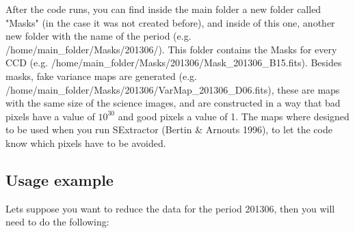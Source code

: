 \documentclass[letter, 12pt]{article}
\begin{document}
After the code runs, you can find inside the main folder a new folder called "Masks" (in the case it was not created before), and inside of this one, another new folder with the name of the period (e.g. /home/main\_folder/Masks/201306/). This folder contains the Masks for every CCD (e.g. /home/main\_folder/Masks/201306/Mask\_201306\_B15.fits). Besides masks, fake variance maps are generated (e.g. /home/main\_folder/Masks/201306/VarMap\_201306\_D06.fits), these are maps with the same size of the science images, and are constructed in a way that bad pixels have a value of $10^{30}$ and good pixels a value of 1. The maps where designed to be used when you run SExtractor (Bertin \& Arnouts 1996), to let the code know which pixels have to be avoided.  


\subsection{Usage example}

Lets suppose you want to reduce the data for the period 201306, then you will need to do the following:
\end{document}
